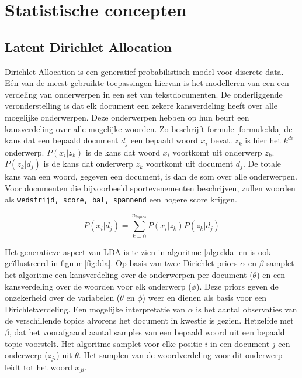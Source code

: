 \section{Statistische concepten}

\subsection{Latent Dirichlet Allocation}
Dirichlet Allocation\cite{Blei2012} is een generatief probabilistisch model voor discrete data. E\'en van de meest gebruikte toepassingen hiervan is het modelleren van een een verdeling van onderwerpen in een set van tekstdocumenten. De onderliggende veronderstelling is dat elk document een zekere kansverdeling heeft over alle mogelijke onderwerpen. Deze onderwerpen hebben op hun beurt een kansverdeling over alle mogelijke woorden. Zo beschrijft formule \ref{formule:lda} de kans dat een bepaald document $d_j$ een bepaald woord $x_i$ bevat. $z_k$ is hier het $k^{de}$ onderwerp. $P(x_i|z_k)$ is de kans dat woord $x_i$ voortkomt uit onderwerp $z_k$. $P(z_k|d_j)$ is de kans dat onderwerp $z_k$ voortkomt uit document $d_j$. De totale kans van een woord, gegeven een document, is dan de som over alle onderwerpen. Voor documenten die bijvoorbeeld sportevenementen beschrijven, zullen woorden als \texttt{wedstrijd, score, bal, spannend} een hogere score krijgen.

\begin{equation}
P(x_i | d_j) = \sum\limits_{k=0}^{n_{topics}}P(x_i|z_k)P(z_k|d_j)
\label{formule:lda}
\end{equation}

Het generatieve aspect van LDA is te zien in algoritme \ref{algo:lda} en is ook ge\"illustreerd in figuur \ref{fig:lda}. Op basis van twee Dirichlet priors $\alpha$ en $\beta$ samplet het algoritme een kansverdeling over de onderwerpen per document ($\theta$) en een kansverdeling over de woorden voor elk onderwerp ($\phi$). Deze priors geven de onzekerheid over de variabelen ($\theta$ en $\phi$) weer en dienen als basis voor een Dirichletverdeling\cite{Huang2005}. Een mogelijke interpretatie van $\alpha$ is het aantal observaties van de verschillende topics alvorens het document in kwestie is gezien. Hetzelfde met $\beta$, dat het voorafgaand aantal samples van een bepaald woord uit een bepaald topic voorstelt. Het algoritme samplet voor elke positie $i$ in een document $j$ een onderwerp ($z_{ji}$) uit $\theta$. Het samplen van de woordverdeling voor dit onderwerp leidt tot het woord $x_{ji}$\cite{LDAsien}.

